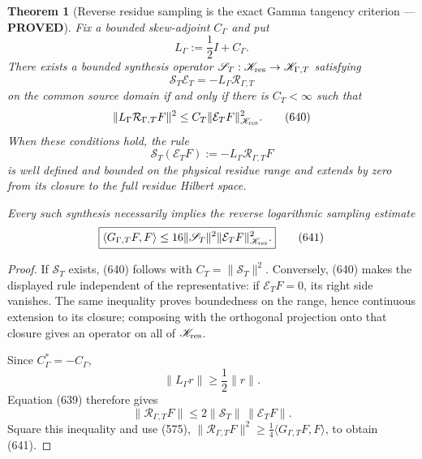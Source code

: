 \documentclass[11pt]{article}
\newtheorem{theorem}{Theorem}
\newcommand{\PROVED}{\textcolor{green!45!black}{\textbf{PROVED}}}
\begin{document}
\begin{theorem}[Reverse residue sampling is the exact Gamma tangency
criterion --- \PROVED]
Fix a bounded skew-adjoint \(C_\Gamma\) and put
\[
 L_\Gamma:=\frac12I+C_\Gamma .
\]
There exists a bounded synthesis operator
\(\mathscr S_T:\mathscr K_{\rm res}\to\mathscr K_{\Gamma,T}\)
satisfying
\begin{equation}
 \mathscr S_T\mathcal E_T
 =-L_\Gamma\mathcal R_{\Gamma,T}                     \tag{639}
\end{equation}
on the common source domain if and only if there is \(C_T<\infty\) such
that
\begin{equation}
 \|L_\Gamma\mathcal R_{\Gamma,T}F\|^2
 \le C_T\|\mathcal E_TF\|_{\mathscr K_{\rm res}}^2.  \tag{640}
\end{equation}
When these conditions hold, the rule
\[
 \mathscr S_T(\mathcal E_TF)
 :=-L_\Gamma\mathcal R_{\Gamma,T}F
\]
is well defined and bounded on the physical residue range and extends by
zero from its closure to the full residue Hilbert space.

Every such synthesis necessarily implies the reverse logarithmic sampling
estimate
\begin{equation}
 \boxed{
 \langle G_{\Gamma,T}F,F\rangle
 \le16\|\mathscr S_T\|^2
       \|\mathcal E_TF\|_{\mathscr K_{\rm res}}^2.}  \tag{641}
\end{equation}
\end{theorem}

\begin{proof}
If \(\mathscr S_T\) exists, (640) follows with
\(C_T=\|\mathscr S_T\|^2\).  Conversely, (640) makes the displayed rule
independent of the representative: if \(\mathcal E_TF=0\), its right side
vanishes.  The same inequality proves boundedness on the range, hence
continuous extension to its closure; composing with the orthogonal
projection onto that closure gives an operator on all of
\(\mathscr K_{\rm res}\).

Since \(C_\Gamma^*=-C_\Gamma\),
\[
 \|L_\Gamma r\|\ge\frac12\|r\|.
\]
Equation (639) therefore gives
\[
 \|\mathcal R_{\Gamma,T}F\|
 \le2\|\mathscr S_T\|\,\|\mathcal E_TF\|.
\]
Square this inequality and use (575),
\(\|\mathcal R_{\Gamma,T}F\|^2\ge
\frac14\langle G_{\Gamma,T}F,F\rangle\), to obtain (641).
\end{proof}
\end{document}
